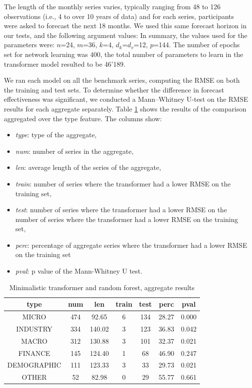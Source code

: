 \documentclass[algorithms,article,submit,pdftex,moreauthors]{Definitions/mdpi}
\begin{document}
The length of the monthly series varies, typically ranging from 48 to 126 observations (i.e., 4 to over 10 years of data) and for each series, participants were asked to forecast the next 18 months. We used this same forecast horizon in our tests, and the following argument values: In summary, the values used for the parameters were: $n$=24, $m$=36, $k$=4, $d_k$=$d_v$=12, $p$=144. The number of epochs set for network learning was 400, the total number of parameters to learn in the transformer model resulted to be 46'189.

We ran each model on all the benchmark series, computing the RMSE on both the training and test sets. To determine whether the difference in forecast effectiveness was significant, we conducted a Mann–Whitney U-test on the RMSE results for each aggregate separately. Table \ref{tab:aggregate} shows the results of the comparison aggregated over the type feature. The columns show:
\begin{itemize}
	\item {\it type}: type of the aggregate,
	\item {\it num}: number of series in the aggregate,
	\item {\it len}: average length of the series of the aggregate,
	\item {\it train}: number of series where the transformer had a lower RMSE on the training set,
	\item {\it test}: number of series where the transformer had a lower RMSE on the number of series where the transformer had a lower RMSE on the training set,
	\item {\it perc}: percentage of aggregate series where the transformer had a lower RMSE on the training set
	\item {\it pval}: p value of the Mann-Whitney U test.
\end{itemize}

\begin{table}[H]
\caption{Minimalistic transformer and random forest, aggregate results}
\label{tab:aggregate}
\centering
\begin{tabular}{ccccccc}
\toprule
{\bf type} & {\bf num} & len & {\bf train} & {\bf test} & {\bf perc} & {\bf pval}\\
\midrule
MICRO 		& 474 &  92.65 & 6 & 134 & 28.27 & 0.000\\
INDUSTRY 	& 334 & 140.02 & 3 & 123 & 36.83 & 0.042\\
MACRO 		& 312 & 130.88 & 3 & 101 & 32.37 & 0.021\\
FINANCE 	& 145 & 124.40 & 1 &  68 & 46.90 & 0.247\\
DEMOGRAPHIC & 111 & 123.33 & 3 &  33 & 29.73 & 0.021\\
OTHER 		&  52 &  82.98 & 0 &  29 & 55.77 & 0.661\\
\bottomrule
\end{tabular}
\end{table}
\end{document}
